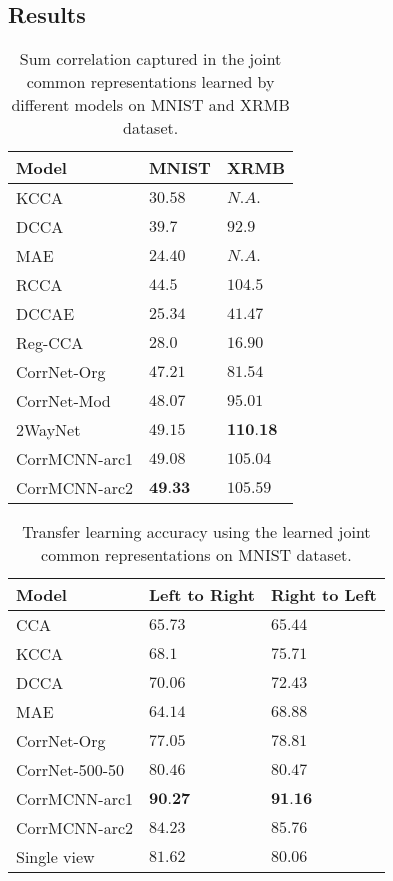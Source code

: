 \documentclass[10pt, a4paper, conference, compsocconf]{IEEEtran}
\begin{document}
\subsection{Results}
\label{sec_res}

\begin{table}[h!]
\centering
\begin{tabular}{|l|l|l|}
 \hline
 \textbf{Model} & {\textbf{MNIST}} & {\textbf{XRMB}} \\
 \hline
 KCCA \cite{yu2014kcca} & $30.58$ & $N.A.$\\
 DCCA \cite{andrew2013dcca} & $39.7$ & $92.9$\\
 MAE \cite{ngiam2011multimodal} & $24.40$ & $N.A.$\\
 RCCA \cite{mineiro2014rcca} & $44.5$ & $104.5$\\
 DCCAE \cite{masci2011cae} & $25.34$ & $41.47$\\
 Reg-CCA \cite{vinod1976reg_cca} & $28.0 $ & $16.90$\\
 CorrNet-Org \cite{chandar2016correlational} & $47.21$ & $81.54$\\
 CorrNet-Mod & $48.07$ & $95.01$\\
 2WayNet \cite{eisenschtat2016linking_2way} & $49.15$ & $\textbf{110.18}$ \\
 \hline
 CorrMCNN-arc1& $49.08$ & $105.04$\\
 CorrMCNN-arc2& $\textbf{49.33}$ & $105.59$\\
 \hline
\end{tabular}
\bigskip
\caption{Sum correlation captured in the joint common representations
learned by different models on MNIST and XRMB dataset.}
\label{tab_res1}
\end{table}

\begin{table}
\centering
\begin{tabular}{|l|l|l|}
 \hline
 \textbf{Model} & {\textbf{Left to Right}} & {\textbf{Right to Left}} \\
 \hline
 CCA \cite{vinod1976reg_cca} & $65.73$ & $65.44$\\
 KCCA \cite{yu2014kcca} & $68.1$ & $75.71$\\
 DCCA \cite{andrew2013dcca} & $70.06$ & $72.43$\\
 MAE \cite{ngiam2011multimodal} & $64.14$ & $68.88$\\
 CorrNet-Org \cite{chandar2016correlational} & $77.05$ & $78.81$\\
 CorrNet-500-50 \cite{chandar2016correlational}& $80.46$ & $80.47$ \\
 \hline
 CorrMCNN-arc1 & $\textbf{90.27}$ & $\textbf{91.16}$\\
 CorrMCNN-arc2 & $84.23$ & $85.76$\\
 \hline
 Single view & $81.62$ & $80.06$ \\
 \hline
\end{tabular}
\bigskip
\caption{Transfer learning accuracy using the learned joint common representations on MNIST dataset.}
\label{tab_res2}
\end{table}
\end{document}
